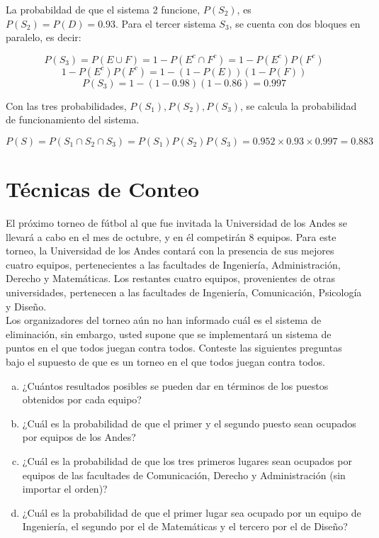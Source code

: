 \documentclass[11pt, spanish]{article}
\begin{document}
\begin{enumerate}[(a)]
La probabildad de que el sistema 2 funcione, $P(S_{2})$, es $P(S_{2}) = P(D) = 0.93$. Para el tercer sistema $S_{3}$, se cuenta con dos bloques en paralelo, es decir:

$$P(S_{3}) = P(E \cup F) = 1 - P(E^c \cap F^c) = 1 - P(E^c)P(F^c)$$
$$1 - P(E^c)P(F^c) = 1 - (1 - P(E))(1 - P(F))$$
$$P(S_{3}) =  1 - (1 - 0.98)(1 - 0.86) = 0.997$$

Con las tres probabilidades, $P(S_1), P(S_2), P(S_3)$, se calcula la probabilidad de funcionamiento del sistema. 

$$P(S) = P(S_1 \cap S_2 \cap S_3) = P(S_1)P(S_2)P(S_3) = 0.952 \times 0.93 \times 0.997 =  0.883$$

\end{enumerate}

\section{Técnicas de Conteo}

El próximo torneo de fútbol al que fue invitada la Universidad de los Andes se llevará a cabo en el mes de octubre, y en él competirán 8 equipos. Para este torneo, la Universidad de los Andes contará con la presencia de sus mejores cuatro equipos, pertenecientes a las facultades de Ingeniería, Administración, Derecho y Matemáticas. Los restantes cuatro equipos, provenientes de otras universidades, pertenecen a las facultades de Ingeniería, Comunicación, Psicología y Diseño.\\

Los organizadores del torneo aún no han informado cuál es el sistema de eliminación, sin embargo, usted supone que se implementará un sistema de puntos en el que todos juegan contra todos. Conteste las siguientes preguntas bajo el supuesto de que es un torneo en el que todos juegan
contra todos.

\begin{enumerate}[(a)]
\item ¿Cuántos resultados posibles se pueden dar en términos de los puestos obtenidos
por cada equipo?

\item ¿Cuál es la probabilidad de que el primer y el segundo puesto sean ocupados por
equipos de los Andes?

\item ¿Cuál es la probabilidad de que los tres primeros lugares sean ocupados por equipos
de las facultades de Comunicación, Derecho y Administración (sin importar el orden)?

\item ¿Cuál es la probabilidad de que el primer lugar sea ocupado por un equipo de
Ingeniería, el segundo por el de Matemáticas y el tercero por el de Diseño?
\end{enumerate}
\end{document}
